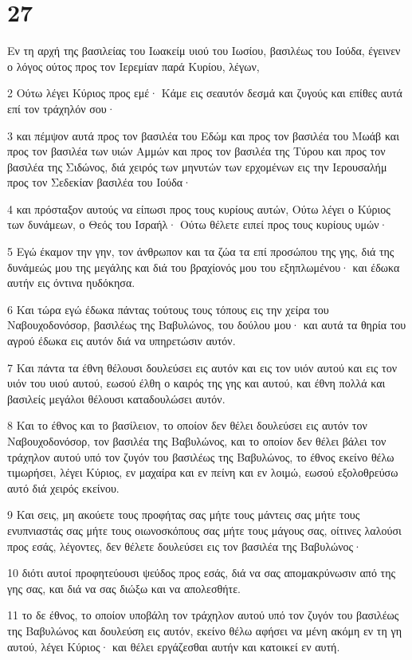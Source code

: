 \chapter{27}

\par Εν τη αρχή της βασιλείας του Ιωακείμ υιού του Ιωσίου, βασιλέως του Ιούδα, έγεινεν ο λόγος ούτος προς τον Ιερεμίαν παρά Κυρίου, λέγων,
\par 2 Ούτω λέγει Κύριος προς εμέ· Κάμε εις σεαυτόν δεσμά και ζυγούς και επίθες αυτά επί τον τράχηλόν σου·
\par 3 και πέμψον αυτά προς τον βασιλέα του Εδώμ και προς τον βασιλέα του Μωάβ και προς τον βασιλέα των υιών Αμμών και προς τον βασιλέα της Τύρου και προς τον βασιλέα της Σιδώνος, διά χειρός των μηνυτών των ερχομένων εις την Ιερουσαλήμ προς τον Σεδεκίαν βασιλέα του Ιούδα·
\par 4 και πρόσταξον αυτούς να είπωσι προς τους κυρίους αυτών, Ούτω λέγει ο Κύριος των δυνάμεων, ο Θεός του Ισραήλ· Ούτω θέλετε ειπεί προς τους κυρίους υμών·
\par 5 Εγώ έκαμον την γην, τον άνθρωπον και τα ζώα τα επί προσώπου της γης, διά της δυνάμεώς μου της μεγάλης και διά του βραχίονός μου του εξηπλωμένου· και έδωκα αυτήν εις όντινα ηυδόκησα.
\par 6 Και τώρα εγώ έδωκα πάντας τούτους τους τόπους εις την χείρα του Ναβουχοδονόσορ, βασιλέως της Βαβυλώνος, του δούλου μου· και αυτά τα θηρία του αγρού έδωκα εις αυτόν διά να υπηρετώσιν αυτόν.
\par 7 Και πάντα τα έθνη θέλουσι δουλεύσει εις αυτόν και εις τον υιόν αυτού και εις τον υιόν του υιού αυτού, εωσού έλθη ο καιρός της γης και αυτού, και έθνη πολλά και βασιλείς μεγάλοι θέλουσι καταδουλώσει αυτόν.
\par 8 Και το έθνος και το βασίλειον, το οποίον δεν θέλει δουλεύσει εις αυτόν τον Ναβουχοδονόσορ, τον βασιλέα της Βαβυλώνος, και το οποίον δεν θέλει βάλει τον τράχηλον αυτού υπό τον ζυγόν του βασιλέως της Βαβυλώνος, το έθνος εκείνο θέλω τιμωρήσει, λέγει Κύριος, εν μαχαίρα και εν πείνη και εν λοιμώ, εωσού εξολοθρεύσω αυτό διά χειρός εκείνου.
\par 9 Και σεις, μη ακούετε τους προφήτας σας μήτε τους μάντεις σας μήτε τους ενυπνιαστάς σας μήτε τους οιωνοσκόπους σας μήτε τους μάγους σας, οίτινες λαλούσι προς εσάς, λέγοντες, δεν θέλετε δουλεύσει εις τον βασιλέα της Βαβυλώνος·
\par 10 διότι αυτοί προφητεύουσι ψεύδος προς εσάς, διά να σας απομακρύνωσιν από της γης σας, και διά να σας διώξω και να απολεσθήτε.
\par 11 το δε έθνος, το οποίον υποβάλη τον τράχηλον αυτού υπό τον ζυγόν του βασιλέως της Βαβυλώνος και δουλεύση εις αυτόν, εκείνο θέλω αφήσει να μένη ακόμη εν τη γη αυτού, λέγει Κύριος· και θέλει εργάζεσθαι αυτήν και κατοικεί εν αυτή.
